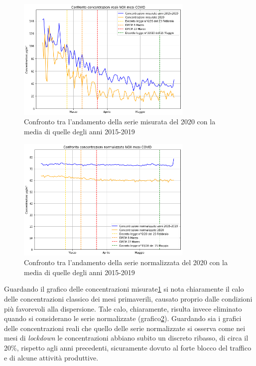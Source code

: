 \documentclass[a4paper,12pt]{report}
\begin{document}
\begin{figure}[h]
\centering
\includegraphics[width=0.75\textwidth]{nox_covid}
\caption{Confronto tra l'andamento della serie misurata del 2020 con la media di quelle degli anni 2015-2019}
\label{fig:nox_covid}
\end{figure}

\begin{figure}[h]
\centering
\includegraphics[width=0.75\textwidth]{nox_covid_norm}
\caption{Confronto tra l'andamento della serie normalizzata del 2020 con la media di quelle degli anni 2015-2019}
\label{fig:nox_covid_norm}
\end{figure}

Guardando il grafico delle concentrazioni misurate\ref{fig:nox_covid} si nota chiaramente il calo delle concentrazioni classico dei mesi primaverili, causato proprio dalle condizioni più favorevoli alla dispersione. Tale calo, chiaramente, risulta invece eliminato quando si considerano le serie normalizzate (grafico\ref{fig:nox_covid_norm}).
Guardando sia i grafici delle concentrazioni reali che quello delle serie normalizzate si osserva come nei mesi di \textit{lockdown} le concentrazioni abbiano subito un discreto ribasso, di circa il 20\%, rispetto agli anni precedenti, sicuramente dovuto al forte blocco del traffico e di alcune attività produttive.
\end{document}
